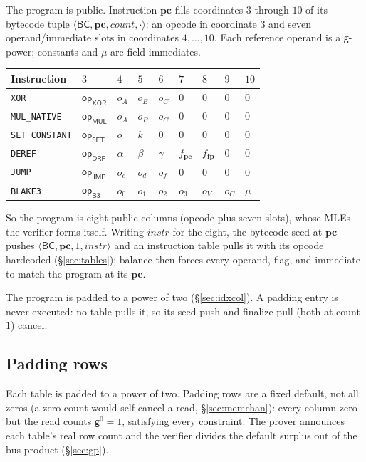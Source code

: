 \documentclass[11pt]{article}
\newcommand{\gen}{\mathsf{g}}
\newcommand{\pc}{\mathbf{pc}}
\newcommand{\fp}{\mathbf{fp}}
\newcommand{\cnt}{\mathit{count}}
\newcommand{\tup}[1]{\langle #1 \rangle}
\newcommand{\dsep}[1]{\mathsf{#1}}
\newcommand{\opc}[1]{\mathsf{op}_{\mathsf{#1}}}
\begin{document}
The program is public. Instruction $\pc$ fills coordinates $3$ through $10$ of its bytecode tuple $\tup{\dsep{BC},\pc,\cnt,\cdot}$: an opcode in coordinate $3$ and seven operand/immediate slots in coordinates $4,\ldots,10$. Each reference operand is a $\gen$-power; constants and $\mu$ are field immediates.
\begin{center}
\begin{tabular}{lllllllll}
\hline
Instruction & $3$ & $4$ & $5$ & $6$ & $7$ & $8$ & $9$ & $10$\\
\hline
\texttt{XOR}           & $\opc{XOR}$ & $o_A$ & $o_B$ & $o_C$ & $0$ & $0$ & $0$ & $0$\\
\texttt{MUL\_NATIVE}   & $\opc{MUL}$ & $o_A$ & $o_B$ & $o_C$ & $0$ & $0$ & $0$ & $0$\\
\texttt{SET\_CONSTANT} & $\opc{SET}$ & $o$   & $k$   & $0$   & $0$ & $0$ & $0$ & $0$\\
\texttt{DEREF}         & $\opc{DRF}$ & $\alpha$ & $\beta$ & $\gamma$ & $f_{\pc}$ & $f_{\fp}$ & $0$ & $0$\\
\texttt{JUMP}          & $\opc{JMP}$ & $o_c$ & $o_d$ & $o_f$ & $0$ & $0$ & $0$ & $0$\\
\texttt{BLAKE3}        & $\opc{B3}$  & $o_0$ & $o_1$ & $o_2$ & $o_3$ & $o_V$ & $o_C$ & $\mu$\\
\hline
\end{tabular}
\end{center}
So the program is eight public columns (opcode plus seven slots), whose MLEs the verifier forms itself. Writing $\mathit{instr}$ for the eight, the bytecode seed at $\pc$ pushes $\tup{\dsep{BC},\pc,1,\mathit{instr}}$ and an instruction table pulls it with its opcode hardcoded (\S\ref{sec:tables}); balance then forces every operand, flag, and immediate to match the program at its $\pc$.

The program is padded to a power of two (\S\ref{sec:idxcol}). A padding entry is never executed: no table pulls it, so its seed push and finalize pull (both at count $1$) cancel.

\subsection{Padding rows}\label{sec:e2e-pad}

Each table is padded to a power of two. Padding rows are a fixed default, not all zeros (a zero count would self-cancel a read, \S\ref{sec:memchan}): every column zero but the read counts $\gen^{0}=1$, satisfying every constraint. The prover announces each table's real row count and the verifier divides the default surplus out of the bus product (\S\ref{sec:gp}).
\end{document}
